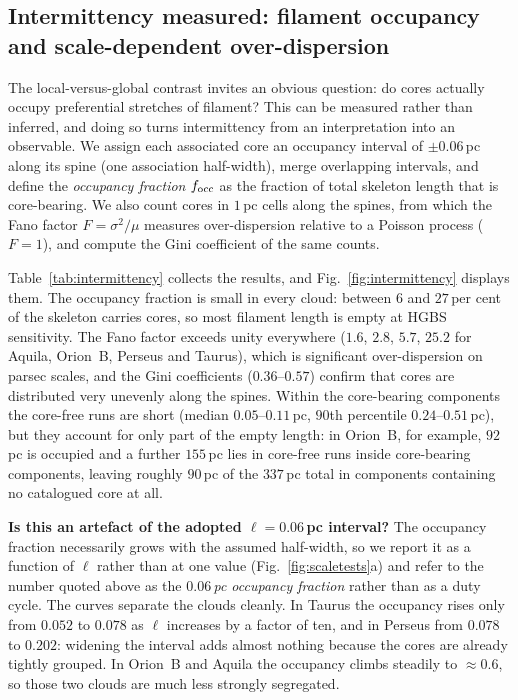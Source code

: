 \documentclass[usenatbib,twoside,twocolumn]{mnras}
\begin{document}
\subsection{Intermittency measured: filament occupancy and scale-dependent over-dispersion}
\label{sec:intermittency}

The local-versus-global contrast invites an obvious question: do cores actually occupy preferential stretches of filament? This can be measured rather than inferred, and doing so turns intermittency from an interpretation into an observable. We assign each associated core an occupancy interval of $\pm0.06$\,pc along its spine (one association half-width), merge overlapping intervals, and define the \emph{occupancy fraction} $f_{\rm occ}$ as the fraction of total skeleton length that is core-bearing. We also count cores in $1$\,pc cells along the spines, from which the Fano factor $F=\sigma^2/\mu$ measures over-dispersion relative to a Poisson process ($F=1$), and compute the Gini coefficient of the same counts.

Table~\ref{tab:intermittency} collects the results, and Fig.~\ref{fig:intermittency} displays them. The occupancy fraction is small in every cloud: between $6$ and $27$\,per cent of the skeleton carries cores, so most filament length is empty at HGBS sensitivity. The Fano factor exceeds unity everywhere ($1.6$, $2.8$, $5.7$, $25.2$ for Aquila, Orion~B, Perseus and Taurus), which is significant over-dispersion on parsec scales, and the Gini coefficients ($0.36$--$0.57$) confirm that cores are distributed very unevenly along the spines. Within the core-bearing components the core-free runs are short (median $0.05$--$0.11$\,pc, $90$th percentile $0.24$--$0.51$\,pc), but they account for only part of the empty length: in Orion~B, for example, $92$\,pc is occupied and a further $155$\,pc lies in core-free runs inside core-bearing components, leaving roughly $90$\,pc of the $337$\,pc total in components containing no catalogued core at all.

\smallskip\noindent\textbf{Is this an artefact of the adopted $\ell=0.06$\,pc interval?} The occupancy fraction necessarily grows with the assumed half-width, so we report it as a function of $\ell$ rather than at one value (Fig.~\ref{fig:scaletests}a) and refer to the number quoted above as the \emph{$0.06$\,pc occupancy fraction} rather than as a duty cycle. The curves separate the clouds cleanly. In Taurus the occupancy rises only from $0.052$ to $0.078$ as $\ell$ increases by a factor of ten, and in Perseus from $0.078$ to $0.202$: widening the interval adds almost nothing because the cores are already tightly grouped. In Orion~B and Aquila the occupancy climbs steadily to $\approx0.6$, so those two clouds are much less strongly segregated. 
\end{document}
